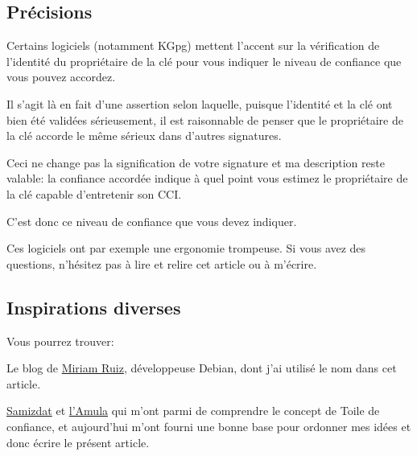 \subsection{Précisions}\label{pruxe9cisions}

Certains logiciels (notamment KGpg) mettent l'accent sur la vérification
de l'identité du propriétaire de la clé pour vous indiquer le niveau de
confiance que vous pouvez accordez.

Il s'agit là en fait d'une assertion selon laquelle, puisque l'identité
et la clé ont bien été validées sérieusement, il est raisonnable de
penser que le propriétaire de la clé accorde le même sérieux dans
d'autres signatures.

Ceci ne change pas la signification de votre signature et ma description
reste valable: la confiance accordée indique à quel point vous estimez
le propriétaire de la clé capable d'entretenir son CCI.

C'est donc ce niveau de confiance que vous devez indiquer.

Ces logiciels ont par exemple une ergonomie trompeuse. Si vous avez des
questions, n'hésitez pas à lire et relire cet article ou à m'écrire.

\subsection{Inspirations diverses}\label{inspirations-diverses}

Vous pourrez trouver:

Le blog de \href{http://www.miriamruiz.es/}{Miriam Ruiz}, développeuse
Debian, dont j'ai utilisé le nom dans cet article.

\href{http://matrix.samizdat.net/crypto/gpg_intro/gpg-intro-5.html}{Samizdat}
et
\href{http://www.amula.asso.fr/site/article.php?id_article=80}{l'Amula}
qui m'ont parmi de comprendre le concept de Toile de confiance, et
aujourd'hui m'ont fourni une bonne base pour ordonner mes idées et donc
écrire le présent article.
